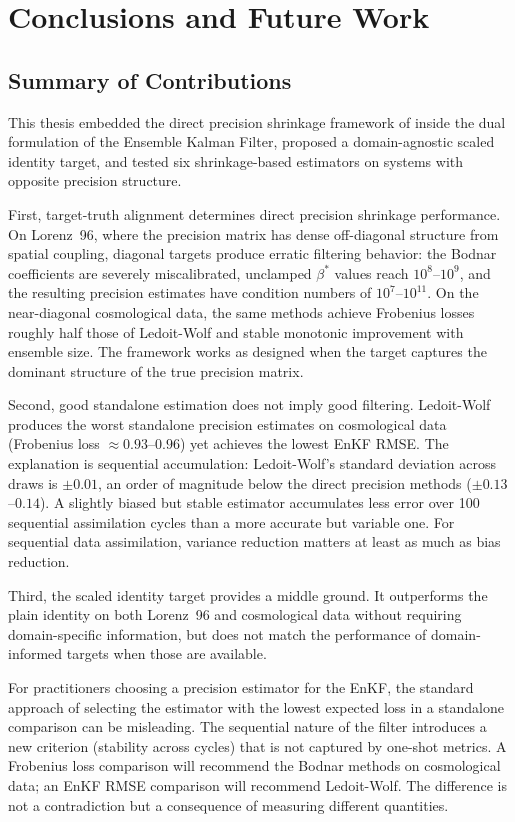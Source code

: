 \chapter{Conclusions and Future Work}
\label{ch:conclusions}

\section{Summary of Contributions}

This thesis embedded the direct precision shrinkage framework of \citep{bodnar2016direct} inside the dual formulation of the Ensemble Kalman Filter, proposed a domain-agnostic scaled identity target, and tested six shrinkage-based estimators on systems with opposite precision structure.

First, target-truth alignment determines direct precision shrinkage performance. On Lorenz~96, where the precision matrix has dense off-diagonal structure from spatial coupling, diagonal targets produce erratic filtering behavior: the Bodnar coefficients are severely miscalibrated, unclamped $\beta^*$ values reach $10^8$--$10^9$, and the resulting precision estimates have condition numbers of $10^7$--$10^{11}$. On the near-diagonal cosmological data, the same methods achieve Frobenius losses roughly half those of Ledoit-Wolf and stable monotonic improvement with ensemble size. The framework works as designed when the target captures the dominant structure of the true precision matrix.

Second, good standalone estimation does not imply good filtering. Ledoit-Wolf produces the worst standalone precision estimates on cosmological data (Frobenius loss $\approx 0.93$--$0.96$) yet achieves the lowest EnKF RMSE. The explanation is sequential accumulation: Ledoit-Wolf's standard deviation across draws is $\pm 0.01$, an order of magnitude below the direct precision methods ($\pm 0.13$--$0.14$). A slightly biased but stable estimator accumulates less error over 100 sequential assimilation cycles than a more accurate but variable one. For sequential data assimilation, variance reduction matters at least as much as bias reduction.

Third, the scaled identity target provides a middle ground. It outperforms the plain identity on both Lorenz~96 and cosmological data without requiring domain-specific information, but does not match the performance of domain-informed targets when those are available.

For practitioners choosing a precision estimator for the EnKF, the standard approach of selecting the estimator with the lowest expected loss in a standalone comparison can be misleading. The sequential nature of the filter introduces a new criterion (stability across cycles) that is not captured by one-shot metrics. A Frobenius loss comparison will recommend the Bodnar methods on cosmological data; an EnKF RMSE comparison will recommend Ledoit-Wolf. The difference is not a contradiction but a consequence of measuring different quantities.

